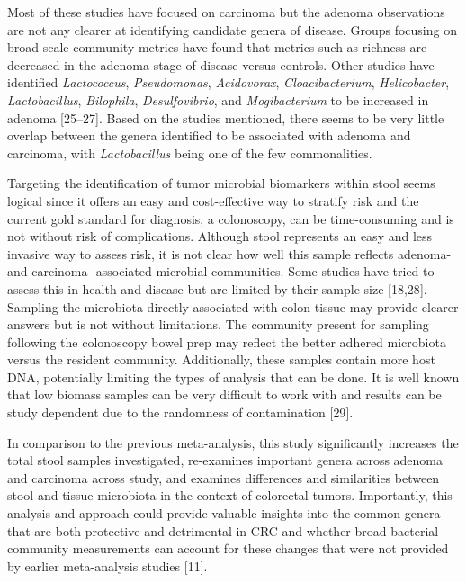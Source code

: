 \documentclass[12pt,]{article}
\begin{document}
Most of these studies have focused on carcinoma but the adenoma
observations are not any clearer at identifying candidate genera of
disease. Groups focusing on broad scale community metrics have found
that metrics such as richness are decreased in the adenoma stage of
disease versus controls. Other studies have identified
\emph{Lactococcus}, \emph{Pseudomonas}, \emph{Acidovorax},
\emph{Cloacibacterium}, \emph{Helicobacter}, \emph{Lactobacillus},
\emph{Bilophila}, \emph{Desulfovibrio}, and \emph{Mogibacterium} to be
increased in adenoma {[}25--27{]}. Based on the studies mentioned, there
seems to be very little overlap between the genera identified to be
associated with adenoma and carcinoma, with \emph{Lactobacillus} being
one of the few commonalities.

Targeting the identification of tumor microbial biomarkers within stool
seems logical since it offers an easy and cost-effective way to stratify
risk and the current gold standard for diagnosis, a colonoscopy, can be
time-consuming and is not without risk of complications. Although stool
represents an easy and less invasive way to assess risk, it is not clear
how well this sample reflects adenoma- and carcinoma- associated
microbial communities. Some studies have tried to assess this in health
and disease but are limited by their sample size {[}18,28{]}. Sampling
the microbiota directly associated with colon tissue may provide clearer
answers but is not without limitations. The community present for
sampling following the colonoscopy bowel prep may reflect the better
adhered microbiota versus the resident community. Additionally, these
samples contain more host DNA, potentially limiting the types of
analysis that can be done. It is well known that low biomass samples can
be very difficult to work with and results can be study dependent due to
the randomness of contamination {[}29{]}.

In comparison to the previous meta-analysis, this study significantly
increases the total stool samples investigated, re-examines important
genera across adenoma and carcinoma across study, and examines
differences and similarities between stool and tissue microbiota in the
context of colorectal tumors. Importantly, this analysis and approach
could provide valuable insights into the common genera that are both
protective and detrimental in CRC and whether broad bacterial community
measurements can account for these changes that were not provided by
earlier meta-analysis studies {[}11{]}.
\end{document}
